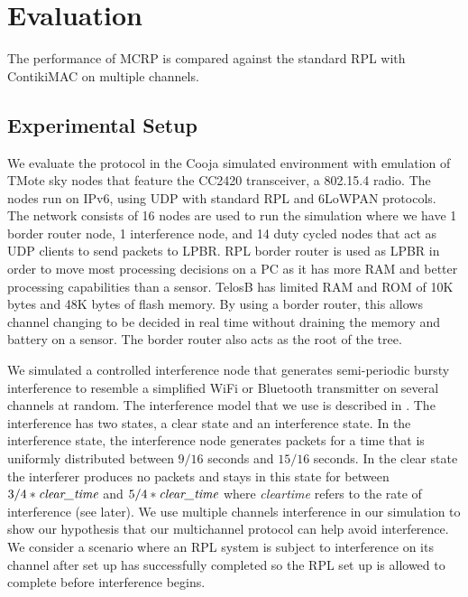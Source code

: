 \section{Evaluation}
\label{sec:evaluation}
The performance of MCRP is compared against the standard RPL with ContikiMAC on multiple channels.

\subsection{Experimental Setup}
We evaluate the protocol in the  Cooja simulated environment with emulation of TMote sky nodes that feature the CC2420 transceiver, a 802.15.4 radio. The nodes run on IPv6, using UDP with standard RPL and 6LoWPAN protocols. The network consists of 16 nodes are used to run the simulation where we have 1 border router node, 1 interference node, and 14 duty cycled nodes that act as UDP clients to send packets to LPBR. RPL border router is used as LPBR in order to move most processing decisions on a PC as it has more RAM and better processing capabilities than a sensor. TelosB has limited RAM and ROM of 10K bytes and 48K bytes of flash memory. By using a border router, this allows channel changing to be decided in real time without draining the memory and battery on a sensor. The border router also acts as the root of the tree.

We simulated a controlled interference node that generates semi-periodic bursty interference to resemble a simplified WiFi or Bluetooth transmitter on several channels at random. The interference model that we use is described in \cite{Boano:2010:MSM:2127940.2127963}. The interference has two states, a clear state and an interference state. 
In the interference state, the interference node generates packets for a time that is uniformly distributed between $9/16$ seconds and $15/16$ seconds. In the clear state the interferer produces no packets and stays in this state for between $3/4 * \emph{clear\textunderscore time}$ and $5/4 * \emph{clear\textunderscore time}$ where \emph{clear\textunderscore time} refers to the rate of interference (see later).
We use multiple channels interference in our simulation to show our hypothesis that our multichannel protocol can help avoid interference. We consider a scenario where an RPL system is subject to interference on its channel after set up has successfully completed so the RPL set up is allowed to complete before interference begins.

